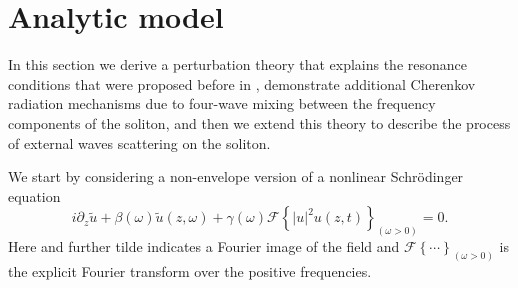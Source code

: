 \documentclass[aps, prl, twocolumn, superscriptaddress, final]{revtex4}
\newcommand{\abs}[1]{\left| #1 \right|}
\begin{document}
\section{Analytic model}%
\label{sec:AnalyticModel}

In this section we derive a perturbation theory that explains the resonance conditions that were proposed before in \cite{melchert2019soliton}, demonstrate additional Cherenkov radiation mechanisms due to four-wave mixing between the frequency components of the soliton, and then we extend this theory to describe the process of external waves scattering on the soliton.

We start by considering a non-envelope version of a nonlinear Schr\"odinger equation~\cite{amiranashvili2010hamiltonian}
\begin{equation}
  \label{eq:GNLSE}
  i \partial_{z} \tilde u
    + \beta(\omega) \tilde u(z, \omega)
    + \gamma(\omega) \mathcal{F} \left\{
      \abs{u}^{2} u(z, t)
    \right\}_{(\omega > 0)} = 0.
\end{equation}
Here and further tilde indicates a Fourier image of the field and $\mathcal{F}\left\{ \cdots \right\}_{(\omega > 0)}$ is the explicit Fourier transform over the positive frequencies.
\end{document}
